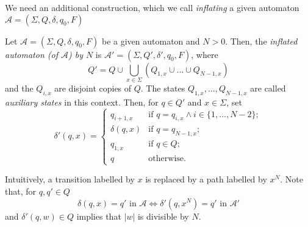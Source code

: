 \begin{toappendix}
We need an additional construction, which we call \emph{inflating}
a given automaton $\mathcal A = (\Sigma, Q, \delta, q_0, F)$


\begin{definition}
\label{def:inflate_aut}
 Let $\mathcal A = (\Sigma, Q, \delta, q_0, F)$
 be a given automaton and $N > 0$.
 Then, the 
 \emph{inflated automaton (of $\mathcal A$) by $N$ } 
 is $\mathcal A' = (\Sigma, Q', \delta', q_0, F)$, where
\[
 Q' = Q \cup \bigcup_{x\in \Sigma} ( Q_{1,x} \cup \ldots \cup Q_{N-1, x} )
\]
and the $Q_{i,x}$ are disjoint copies of $Q$.
The states $Q_{1,x}, \ldots, Q_{N-1,x}$
are called \emph{auxiliary states} in this context.
Then, for $q \in Q'$ and $x \in \Sigma$, set
\[
 \delta'(q, x) = \left\{
 \begin{array}{ll}
  q_{i+1,x}    & \mbox{if } q = q_{i,x} \land i \in \{1,\ldots, N-2\}; \\
  \delta(q, x) & \mbox{if } q = q_{N-1,x}; \\
  q_{1,x}      & \mbox{if } q \in Q; \\
  q            & \mbox{otherwise.}
 \end{array}
 \right.
\]
\end{definition}

Intuitively, a transition labelled by $x$ is replaced by a path labelled by $x^N$.
Note that, for $q,q' \in Q$
\[
 \delta(q, x) = q' \mbox{ in } \mathcal A
 \Leftrightarrow \delta'(q, x^N) = q' \mbox{ in } \mathcal A'
\]
and $\delta'(q, w) \in Q$ implies that $|w|$
is divisible by $N$.
\end{toappendix}